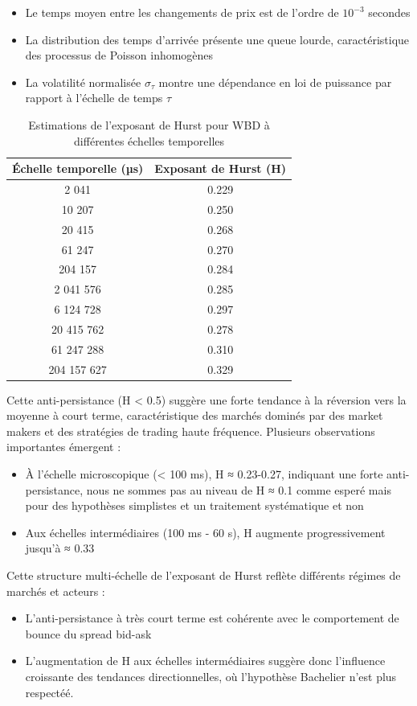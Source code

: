 \documentclass[10pt,a4paper]{article}
\theoremstyle{definition}
\theoremstyle{remark}
\begin{document}
\begin{itemize}
\begin{itemize}
    \item Le temps moyen entre les changements de prix est de l'ordre de \(10^{-3}\) secondes
    \item La distribution des temps d'arrivée présente une queue lourde, caractéristique des processus de Poisson inhomogènes
    \item La volatilité normalisée \(\sigma_{\tau}\) montre une dépendance en loi de puissance par rapport à l'échelle de temps \(\tau\)
\end{itemize}
\begin{table}[h!]
\centering
\begin{tabular}{|c|c|}
\hline
\textbf{Échelle temporelle (µs)} & \textbf{Exposant de Hurst (H)} \\
\hline
2 041 & 0.229 \\
10 207 & 0.250 \\
20 415 & 0.268 \\
61 247 & 0.270 \\
204 157 & 0.284 \\
2 041 576 & 0.285 \\
6 124 728 & 0.297 \\
20 415 762 & 0.278 \\
61 247 288 & 0.310 \\
204 157 627 & 0.329 \\
\hline
\end{tabular}
\caption{Estimations de l'exposant de Hurst pour WBD à différentes échelles temporelles}
\label{tab:hurst_exponents}
\end{table}

Cette anti-persistance (H < 0.5) suggère une forte tendance à la réversion vers la moyenne à court terme, caractéristique des marchés dominés par des market makers et des stratégies de trading haute fréquence. Plusieurs observations importantes émergent :

\begin{itemize}
    \item À l'échelle microscopique (< 100 ms), H ≈ 0.23-0.27, indiquant une forte anti-persistance, nous ne sommes pas au niveau de H ≈ 0.1 comme esperé mais pour des hypothèses simplistes et un traitement systématique et non 
    \item Aux échelles intermédiaires (100 ms - 60 s), H augmente progressivement jusqu'à ≈ 0.33
\end{itemize}

Cette structure multi-échelle de l'exposant de Hurst reflète différents régimes de marchés et acteurs :
\begin{itemize}
    \item L'anti-persistance à très court terme est cohérente avec le comportement de bounce du spread bid-ask
    \item L'augmentation de H aux échelles intermédiaires suggère donc l'influence croissante des tendances directionnelles, où l'hypothèse Bachelier n'est plus respectéé.
\end{itemize}



\end{itemize}
\end{document}
